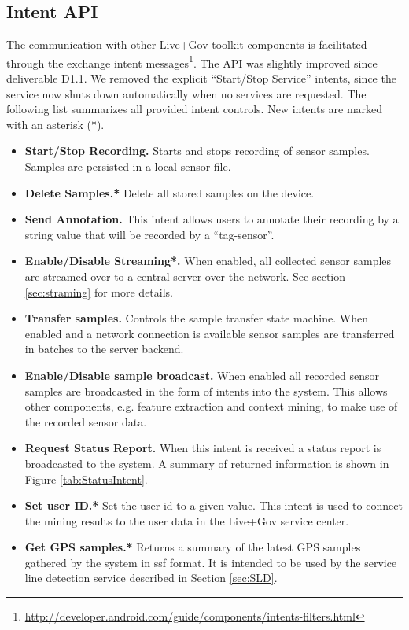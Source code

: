 \subsection{Intent API}
\label{subsubsec:IntentAPIdescription}

The communication with other Live+Gov toolkit components is
facilitated through the exchange intent
messages\footnote{\url{http://developer.android.com/guide/components/intents-filters.html}}.
The API was slightly improved since deliverable D1.1. We removed the
explicit ``Start/Stop Service'' intents, since the service now shuts
down automatically when no services are requested. The following list
summarizes all provided intent controls. New intents are marked with
an asterisk (*).

\begin{itemize}
\item {\bfseries Start/Stop Recording.} Starts and stops recording of
  sensor samples. Samples are persisted in a local sensor file.
\item {\bfseries Delete Samples.*} Delete all stored samples on the
  device.
\item {\bf Send Annotation.} This intent allows users to annotate
  their recording by a string value that will be recorded by a
  ``tag-sensor''.
\item {\bfseries Enable/Disable Streaming*.} When enabled, all
  collected sensor samples are streamed over to a central server over
  the network. See section \ref{sec:straming} for more details.
\item {\bfseries Transfer samples.}  Controls the sample transfer
  state machine. When enabled and a network connection is available
  sensor samples are transferred in batches to the server backend.
\item {\bfseries Enable/Disable sample broadcast.} When enabled all
  recorded sensor samples are broadcasted in the form of intents into
  the system. This allows other components, e.g. feature extraction
  and context mining, to make use of the recorded sensor data.
\item {\bfseries Request Status Report.} When this intent is received
  a status report is broadcasted to the system. A summary of returned
  information is shown in Figure \ref{tab:StatusIntent}.
\item {\bfseries Set user ID.*} Set the user id to a given value. This
  intent is used to connect the mining results to the user data in the
  Live+Gov service center.
\item {\bfseries Get GPS samples.*} Returns a summary of the latest
  GPS samples gathered by the system in ssf format. It is intended to
  be used by the service line detection service described in Section \ref{sec:SLD}.
\end{itemize}

